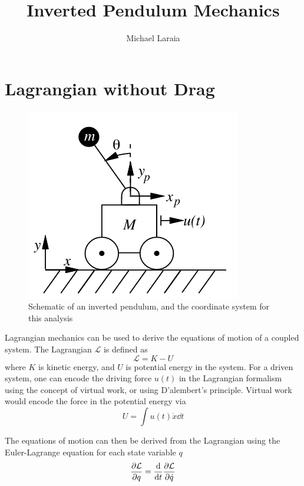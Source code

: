 \documentclass[a4paper,12pt]{article}
\title{Inverted Pendulum Mechanics}
\author{Michael Laraia}
\begin{document}
\maketitle



\section{Lagrangian without Drag}

\begin{figure}
    \centering
    \includegraphics[width=0.6\linewidth]{figs/cartpole2.png}
    \caption{Schematic of an inverted pendulum, and the coordinate system for
    this analysis \cite{cartpole}}
\end{figure}

Lagrangian mechanics can be used to derive the equations of motion of a coupled
system. The Lagrangian $\mathcal{L}$ is defined as
\begin{equation}
    \mathcal{L} = K - U
\end{equation}
where $K$ is kinetic energy, and $U$ is potential energy in the system. For a
driven system, one can encode the driving force $u(t)$ in the Lagrangian
formalism using the concept of virtual work, or using D'alembert's principle.
Virtual work would encode the force in the potential energy via
\begin{equation}
    U = \int u(t) \dot{x} \dd t
\end{equation}

The equations of motion can then be derived from the Lagrangian using the
Euler-Lagrange equation for each state variable $q$
\begin{equation}
    \pdv{\mathcal{L}}{q} = \dv{t} \pdv{\mathcal{L}}{\dot{q}}
\end{equation}
\end{document}
